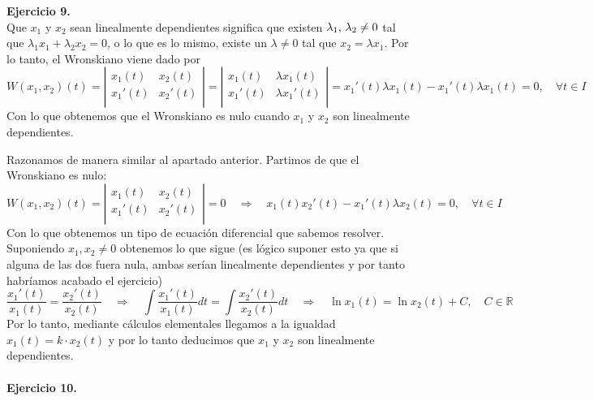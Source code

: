 \documentclass[fleqn]{article}
\def\R{\mathds{R}}
\begin{document}
    \textbf{Ejercicio 9.} \\

    \framebox{$\Rightarrow$}
    Que $x_1$ y $x_2$ sean linealmente dependientes significa que existen $\lambda_1, \thinspace \lambda_2 \neq 0$ tal que $\lambda_1x_1 + \lambda_2x_2 = 0$,
    o lo que es lo mismo, existe un $\lambda \neq 0$ tal que $x_2=\lambda x_1$. Por lo tanto, el Wronskiano viene dado por 
    $$W(x_1,x_2)(t) = \left|
    \begin{matrix}
        x_1(t) & x_2(t) \\
        x_1'(t) & x_2'(t) \\
    \end{matrix}
    \right|= \left|
    \begin{matrix}
        x_1(t) & \lambda x_1(t) \\
        x_1'(t) & \lambda x_1'(t) \\
    \end{matrix}
    \right| = x_1'(t)\lambda x_1(t) - x_1'(t)\lambda x_1(t)=0, \quad \forall t \in I
    $$
    Con lo que obtenemos que el Wronskiano es nulo cuando  $x_1$ y $x_2$ son linealmente dependientes.

    \framebox{$\Leftarrow$} Razonamos de manera similar al apartado anterior. Partimos de que el Wronskiano es nulo:
    $$W(x_1,x_2)(t) = \left|
    \begin{matrix}
        x_1(t) & x_2(t) \\
        x_1'(t) & x_2'(t) \\
    \end{matrix}
    \right|=0 \quad \Rightarrow \quad x_1(t) x_2'(t) - x_1'(t)\lambda x_2(t)=0, \quad \forall t \in I$$
    Con lo que obtenemos un tipo de ecuación diferencial que sabemos resolver. Suponiendo $x_1,x_2 \neq 0$ obtenemos lo que sigue
    (es lógico suponer esto ya que si alguna de las dos fuera nula, ambas serían linealmente dependientes 
    y por tanto habríamos acabado el ejercicio)
    $$\frac{x_1'(t)}{x_1(t)}=\frac{x_2'(t)}{x_2(t)} \quad \Rightarrow \quad  \int \frac{x_1'(t)}{x_1(t)} dt=\int \frac{x_2'(t)}{x_2(t)} dt
    \quad \Rightarrow \quad \ln x_1(t) = \ln x_2(t) +C, \quad C\in\R$$
    Por lo tanto, mediante cálculos elementales llegamos a la igualdad $x_1(t)=k\cdot x_2(t)$ y por lo tanto deducimos que  $x_1$ y $x_2$ son linealmente dependientes.\\ \\

    \textbf{Ejercicio 10.} \\
\end{document}
